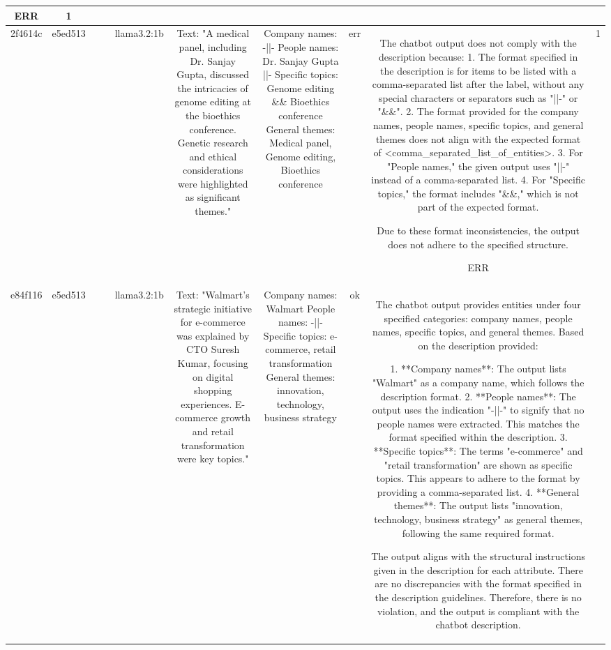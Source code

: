 \begin{table}[h!]
\begin{tabular}{|c|c|c|c|c|c|c|c|c|c|}
ERR & 1\\
\hline
2f4614c & e5ed513 &  &  & llama3.2:1b & Text: "A medical panel, including Dr. Sanjay Gupta, discussed the intricacies of genome editing at the bioethics conference. Genetic research and ethical considerations were highlighted as significant themes." & Company names: -||-
People names: Dr. Sanjay Gupta ||-
Specific topics: Genome editing \&\& Bioethics conference
General themes: Medical panel, Genome editing, Bioethics conference & err & The chatbot output does not comply with the description because:
1. The format specified in the description is for items to be listed with a comma-separated list after the label, without any special characters or separators such as "||-" or "\&\&".
2. The format provided for the company names, people names, specific topics, and general themes does not align with the expected format of <comma_separated_list_of_entities>. 
3. For "People names," the given output uses "||-" instead of a comma-separated list.
4. For "Specific topics," the format includes "\&\&," which is not part of the expected format.

Due to these format inconsistencies, the output does not adhere to the specified structure.

ERR & 1\\
\hline
e84f116 & e5ed513 &  &  & llama3.2:1b & Text: "Walmart's strategic initiative for e-commerce was explained by CTO Suresh Kumar, focusing on digital shopping experiences. E-commerce growth and retail transformation were key topics." & Company names: Walmart
People names: -||-
Specific topics: e-commerce, retail transformation
General themes: innovation, technology, business strategy & ok & The chatbot output provides entities under four specified categories: company names, people names, specific topics, and general themes. Based on the description provided:

1. **Company names**: The output lists "Walmart" as a company name, which follows the description format.
2. **People names**: The output uses the indication "-||-" to signify that no people names were extracted. This matches the format specified within the description.
3. **Specific topics**: The terms "e-commerce" and "retail transformation" are shown as specific topics. This appears to adhere to the format by providing a comma-separated list.
4. **General themes**: The output lists "innovation, technology, business strategy" as general themes, following the same required format.

The output aligns with the structural instructions given in the description for each attribute. There are no discrepancies with the format specified in the description guidelines. Therefore, there is no violation, and the output is compliant with the chatbot description.


\end{tabular}
\end{table}
